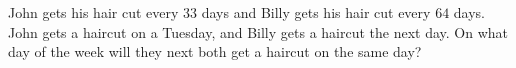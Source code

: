 John gets his hair cut every $33$ days and Billy gets his hair cut every $64$ days. John gets a haircut on a Tuesday, and Billy gets a haircut the next day. On what day of the week will they next both get a haircut on the same day?
